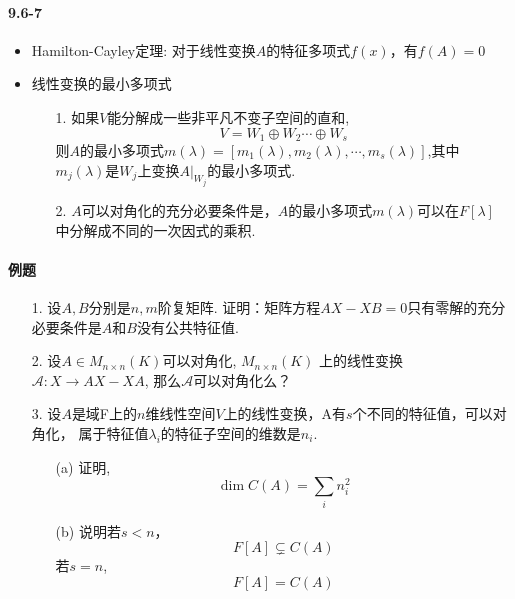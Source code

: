 \paragraph{9.6-7}
\begin{itemize}
    \item Hamilton-Cayley定理: 对于线性变换$A$的特征多项式$f(x)$，有$f(A)=0$
    \item 线性变换的最小多项式
    \begin{itemize}
        \item [1. ] 如果$V$能分解成一些非平凡不变子空间的直和,
        $$V = W_1 \oplus W_2 \cdots \oplus W_s$$
        则$A$的最小多项式$m(\lambda) = [m_1(\lambda), m_2(\lambda), \cdots, m_s(\lambda)]$,其中
        $m_j(\lambda)$是$W_j$上变换$A|_{W_{j}}$的最小多项式.
        \item [2. ] $A$可以对角化的充分必要条件是，$A$的最小多项式$m(\lambda)$可以在$F[\lambda]$
        中分解成不同的一次因式的乘积.
    \end{itemize}
\end{itemize}

\paragraph{例题}
\begin{itemize}
    \item [1.] 设$A,B$分别是$n,m$阶复矩阵. 证明：矩阵方程$AX-XB=0$只有零解的充分必要条件是$A$和$B$没有公共特征值.
    \vspace{3cm}

	\item [2.] 设$A \in M_{n\times n}(K)$可以对角化, $M_{n\times n}(K)$
	上的线性变换$\mathcal{A}: X \rightarrow AX-XA$, 那么$\mathcal{A}$可以对角化么？
	\vspace{3cm}

    \item [3.] 设$A$是域F上的$n$维线性空间$V$上的线性变换，A有$s$个不同的特征值，可以对角化，
    属于特征值$\lambda_i$的特征子空间的维数是$n_i$.
    \begin{itemize}
        \item [(a) ] 证明,
        $$\dim C(A) = \sum_{i} n_i^2$$
        \item [(b) ] 说明若$s<n$，
        $$F[A] \subsetneq C(A)$$
        若$s=n$,
        $$F[A] = C(A)$$
    \end{itemize}
\end{itemize}


